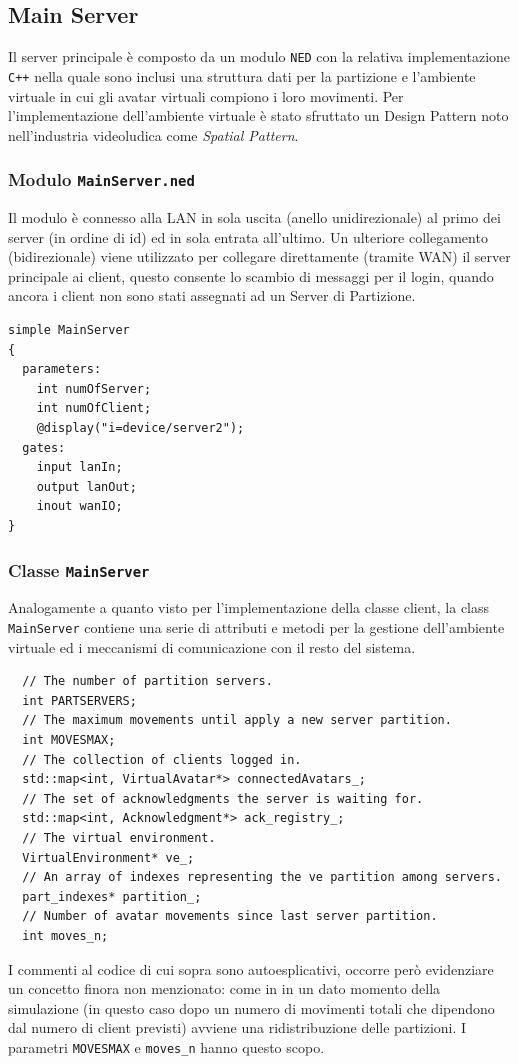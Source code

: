 \documentclass[a4paper, 11pt, oneside]{book}
\theoremstyle{definition}
\theoremstyle{remark}
\begin{document}
\subsection{Main Server}
Il server principale è composto da un modulo \texttt{NED} con la relativa
implementazione \texttt{C++} nella quale sono inclusi una struttura dati per
la partizione e l'ambiente virtuale in cui gli avatar virtuali
compiono i loro movimenti. Per l'implementazione dell'ambiente virtuale è stato
sfruttato un Design Pattern noto nell'industria videoludica
\cite{GamePattern}
come \emph{Spatial Pattern}.

\subsubsection{Modulo \texttt{MainServer.ned}}
Il modulo è connesso alla LAN in sola uscita (anello unidirezionale) al primo
dei server (in ordine di id) ed in sola entrata all'ultimo. Un ulteriore
collegamento (bidirezionale) viene utilizzato per collegare direttamente
(tramite WAN)
il server principale ai client, questo consente lo scambio di messaggi per
il login, quando ancora i client non sono stati assegnati ad un Server di
Partizione.
\begin{lstlisting}
simple MainServer
{
  parameters:
    int numOfServer;
    int numOfClient;
    @display("i=device/server2");
  gates:
    input lanIn;
    output lanOut;
    inout wanIO;
}
\end{lstlisting}

\subsubsection{Classe \texttt{MainServer}}
Analogamente a quanto visto per l'implementazione della classe client, la
class \texttt{MainServer} contiene una serie di attributi e metodi per
la gestione dell'ambiente virtuale ed i meccanismi di comunicazione con
il resto del sistema.
\begin{lstlisting}
  // The number of partition servers.
  int PARTSERVERS;
  // The maximum movements until apply a new server partition.
  int MOVESMAX;
  // The collection of clients logged in.
  std::map<int, VirtualAvatar*> connectedAvatars_;
  // The set of acknowledgments the server is waiting for.
  std::map<int, Acknowledgment*> ack_registry_;
  // The virtual environment.
  VirtualEnvironment* ve_;
  // An array of indexes representing the ve partition among servers.
  part_indexes* partition_;
  // Number of avatar movements since last server partition.
  int moves_n;
\end{lstlisting}
I commenti al codice di cui sopra sono autoesplicativi, occorre però evidenziare
un concetto finora non menzionato: come in \cite{IDVE} in un dato momento
della simulazione (in questo caso dopo un numero di movimenti totali che
dipendono dal numero di client previsti) avviene una ridistribuzione delle
partizioni. I parametri \texttt{MOVESMAX} e \texttt{moves\_n} hanno questo
scopo.
\end{document}
